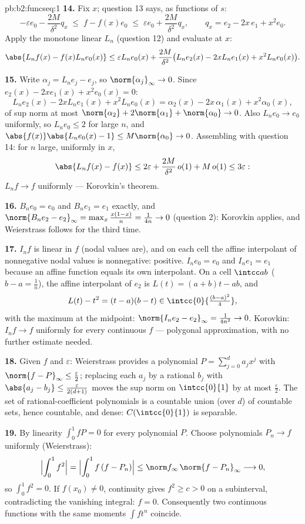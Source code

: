 \begin{solution}{pb:b2:funcseq:1}
\textbf{14.} Fix $x$; question 13 says, as functions of $s$:
\[
-\varepsilon e_0 - \frac{2M}{\delta^2}q_x
\;\leq\; f - f(x)e_0
\;\leq\; \varepsilon e_0 + \frac{2M}{\delta^2}q_x,
\qquad q_x = e_2 - 2x\,e_1 + x^2e_0 .
\]
Apply the monotone linear $L_n$ (question 12) and evaluate at
$x$:
\[
\abs{L_nf(x) - f(x)L_ne_0(x)}
\leq \varepsilon L_ne_0(x)
+ \frac{2M}{\delta^2}\bigl(L_ne_2(x) - 2xL_ne_1(x)
+ x^2L_ne_0(x)\bigr) .
\]

\textbf{15.} Write $\alpha_j = L_ne_j - e_j$, so
$\norm{\alpha_j}_\infty \to 0$. Since $e_2(x) - 2xe_1(x) +
x^2e_0(x) = 0$:
\[
L_ne_2(x) - 2xL_ne_1(x) + x^2L_ne_0(x)
= \alpha_2(x) - 2x\,\alpha_1(x) + x^2\alpha_0(x),
\]
of sup norm at most $\norm{\alpha_2} + 2\norm{\alpha_1} +
\norm{\alpha_0} \to 0$. Also $L_ne_0 \to e_0$ uniformly, so
$L_ne_0 \leq 2$ for large $n$, and $\abs{f(x)}\abs{L_ne_0(x) -
1} \leq M\norm{\alpha_0} \to 0$. Assembling with question 14:
for $n$ large, uniformly in $x$,
\[
\abs{L_nf(x) - f(x)} \leq 2\varepsilon +
\frac{2M}{\delta^2}\,o(1) + M\,o(1) \leq 3\varepsilon :
\]
$L_nf \to f$ uniformly --- Korovkin's theorem.

\textbf{16.} $B_ne_0 = e_0$ and $B_ne_1 = e_1$ exactly, and
$\norm{B_ne_2 - e_2}_\infty = \max_x\frac{x(1-x)}{n} =
\frac{1}{4n} \to 0$ (question 2): Korovkin applies, and
Weierstrass follows for the third time.

\textbf{17.} $I_nf$ is linear in $f$ (nodal values are), and on
each cell the affine interpolant of nonnegative nodal values is
nonnegative: positive. $I_ne_0 = e_0$ and $I_ne_1 = e_1$
because an affine function equals its own interpolant. On a
cell $\intcc ab$ ($b - a = \frac1n$), the affine interpolant of
$e_2$ is $L(t) = (a+b)t - ab$, and
\[
L(t) - t^2 = (t-a)(b-t) \in
\intcc{0}{\tfrac{(b-a)^2}{4}} ,
\]
with the maximum at the midpoint: $\norm{I_ne_2 - e_2}_\infty =
\frac{1}{4n^2} \to 0$. Korovkin: $I_nf \to f$ uniformly for
every continuous $f$ --- polygonal approximation, with no
further estimate needed.

\textbf{18.} Given $f$ and $\varepsilon$: Weierstrass provides
a polynomial $P = \sum_{j=0}^d a_jx^j$ with $\norm{f -
P}_\infty \leq \frac\varepsilon2$; replacing each $a_j$ by a
rational $b_j$ with $\abs{a_j - b_j} \leq
\frac{\varepsilon}{2(d+1)}$ moves the sup norm on
$\intcc{0}{1}$ by at most $\frac\varepsilon2$. The set of
rational-coefficient polynomials is a countable union (over
$d$) of countable sets, hence countable, and dense:
$C(\intcc{0}{1})$ is separable.

\textbf{19.} By linearity $\int_0^1 fP = 0$ for every
polynomial $P$. Choose polynomials $P_n \to f$ uniformly
(Weierstrass):
\[
\Bigl|\int_0^1 f^2\Bigr|
= \Bigl|\int_0^1 f\,(f - P_n)\Bigr|
\leq \norm f_\infty\,\norm{f - P_n}_\infty
\longrightarrow 0 ,
\]
so $\int_0^1 f^2 = 0$. If $f(x_0) \neq 0$, continuity gives
$f^2 \geq c > 0$ on a subinterval, contradicting the vanishing
integral: $f = 0$. Consequently two continuous functions with
the same moments $\int f t^n$ coincide.


\end{solution}
